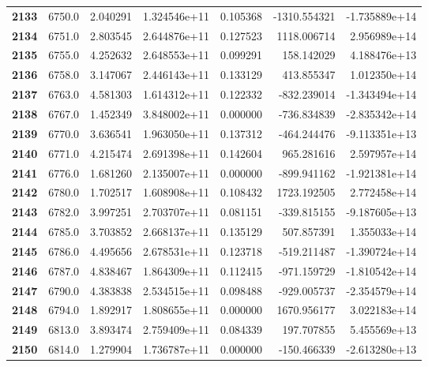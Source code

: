 \documentclass{report}[12pt]
\begin{document}
\begin{center}
\begin{tabular}{lrrrrrr}
\textbf{2133} &         6750.0 &   2.040291 &  1.324546e+11 &    0.105368 & -1310.554321 & -1.735889e+14 \\
\textbf{2134} &         6751.0 &   2.803545 &  2.644876e+11 &    0.127523 &  1118.006714 &  2.956989e+14 \\
\textbf{2135} &         6755.0 &   4.252632 &  2.648553e+11 &    0.099291 &   158.142029 &  4.188476e+13 \\
\textbf{2136} &         6758.0 &   3.147067 &  2.446143e+11 &    0.133129 &   413.855347 &  1.012350e+14 \\
\textbf{2137} &         6763.0 &   4.581303 &  1.614312e+11 &    0.122332 &  -832.239014 & -1.343494e+14 \\
\textbf{2138} &         6767.0 &   1.452349 &  3.848002e+11 &    0.000000 &  -736.834839 & -2.835342e+14 \\
\textbf{2139} &         6770.0 &   3.636541 &  1.963050e+11 &    0.137312 &  -464.244476 & -9.113351e+13 \\
\textbf{2140} &         6771.0 &   4.215474 &  2.691398e+11 &    0.142604 &   965.281616 &  2.597957e+14 \\
\textbf{2141} &         6776.0 &   1.681260 &  2.135007e+11 &    0.000000 &  -899.941162 & -1.921381e+14 \\
\textbf{2142} &         6780.0 &   1.702517 &  1.608908e+11 &    0.108432 &  1723.192505 &  2.772458e+14 \\
\textbf{2143} &         6782.0 &   3.997251 &  2.703707e+11 &    0.081151 &  -339.815155 & -9.187605e+13 \\
\textbf{2144} &         6785.0 &   3.703852 &  2.668137e+11 &    0.135129 &   507.857391 &  1.355033e+14 \\
\textbf{2145} &         6786.0 &   4.495656 &  2.678531e+11 &    0.123718 &  -519.211487 & -1.390724e+14 \\
\textbf{2146} &         6787.0 &   4.838467 &  1.864309e+11 &    0.112415 &  -971.159729 & -1.810542e+14 \\
\textbf{2147} &         6790.0 &   4.383838 &  2.534515e+11 &    0.098488 &  -929.005737 & -2.354579e+14 \\
\textbf{2148} &         6794.0 &   1.892917 &  1.808655e+11 &    0.000000 &  1670.956177 &  3.022183e+14 \\
\textbf{2149} &         6813.0 &   3.893474 &  2.759409e+11 &    0.084339 &   197.707855 &  5.455569e+13 \\
\textbf{2150} &         6814.0 &   1.279904 &  1.736787e+11 &    0.000000 &  -150.466339 & -2.613280e+13 \\

\end{tabular}
\end{center}
\end{document}
